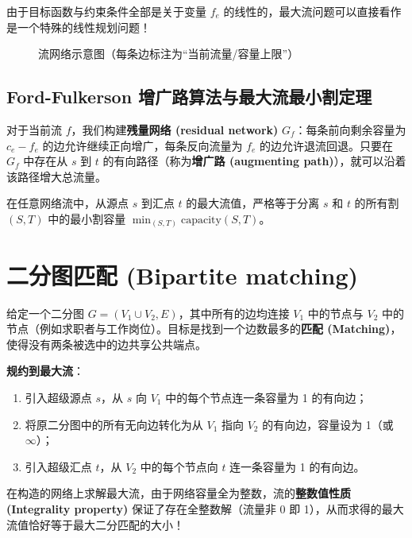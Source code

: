 由于目标函数与约束条件全部是关于变量 $f_e$ 的线性的，最大流问题可以直接看作是一个特殊的线性规划问题！

\begin{figure}[htbp]
\centering
{}
\caption{流网络示意图（每条边标注为“当前流量/容量上限”）}
\label{fig:flow_network}
\end{figure}

\subsection*{Ford-Fulkerson 增广路算法与最大流最小割定理}
对于当前流 $f$，我们构建\textbf{残量网络 (residual network)} $G_f$：每条前向剩余容量为 $c_e - f_e$ 的边允许继续正向增广，每条反向流量为 $f_e$ 的边允许退流回退。只要在 $G_f$ 中存在从 $s$ 到 $t$ 的有向路径（称为\textbf{增广路 (augmenting path)}），就可以沿着该路径增大总流量。

\begin{theorem}
在任意网络流中，从源点 $s$ 到汇点 $t$ 的最大流值，严格等于分离 $s$ 和 $t$ 的所有割 $(S, T)$ 中的最小割容量 $\min_{(S, T)} \text{capacity}(S, T)$。
\end{theorem}

\section{二分图匹配 (Bipartite matching)}

给定一个二分图 $G = (V_1 \cup V_2, E)$，其中所有的边均连接 $V_1$ 中的节点与 $V_2$ 中的节点（例如求职者与工作岗位）。目标是找到一个边数最多的\textbf{匹配 (Matching)}，使得没有两条被选中的边共享公共端点。

\textbf{规约到最大流}：
\begin{enumerate}
    \item 引入超级源点 $s$，从 $s$ 向 $V_1$ 中的每个节点连一条容量为 1 的有向边；
    \item 将原二分图中的所有无向边转化为从 $V_1$ 指向 $V_2$ 的有向边，容量设为 1（或 $\infty$）；
    \item 引入超级汇点 $t$，从 $V_2$ 中的每个节点向 $t$ 连一条容量为 1 的有向边。
\end{enumerate}
在构造的网络上求解最大流，由于网络容量全为整数，流的\textbf{整数值性质 (Integrality property)} 保证了存在全整数解（流量非 0 即 1），从而求得的最大流值恰好等于最大二分匹配的大小！

